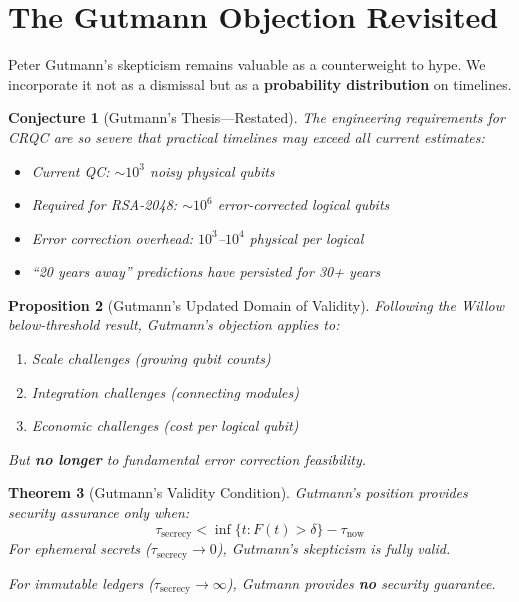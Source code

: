 \documentclass[11pt,a4paper]{article}
\newtheorem{theorem}{Theorem}[section]
\newtheorem{proposition}[theorem]{Proposition}
\newtheorem{conjecture}[theorem]{Conjecture}
\begin{document}
\section{The Gutmann Objection Revisited}

Peter Gutmann's skepticism remains valuable as a counterweight to hype. We incorporate it not as a dismissal but as a \textbf{probability distribution} on timelines.

\begin{conjecture}[Gutmann's Thesis---Restated]
The engineering requirements for CRQC are so severe that practical timelines may exceed all current estimates:
\begin{itemize}[noitemsep]
    \item Current QC: $\sim 10^3$ noisy physical qubits
    \item Required for RSA-2048: $\sim 10^6$ error-corrected logical qubits
    \item Error correction overhead: $10^3$--$10^4$ physical per logical
    \item ``20 years away'' predictions have persisted for 30+ years
\end{itemize}
\end{conjecture}

\begin{proposition}[Gutmann's Updated Domain of Validity]
Following the Willow below-threshold result, Gutmann's objection applies to:
\begin{enumerate}[noitemsep]
    \item Scale challenges (growing qubit counts)
    \item Integration challenges (connecting modules)
    \item Economic challenges (cost per logical qubit)
\end{enumerate}
But \textbf{no longer} to fundamental error correction feasibility.
\end{proposition}

\begin{theorem}[Gutmann's Validity Condition]
Gutmann's position provides security assurance only when:
\begin{equation}
\tau_{\text{secrecy}} < \inf\{t : F(t) > \delta\} - \tau_{\text{now}}
\end{equation}
For ephemeral secrets ($\tau_{\text{secrecy}} \to 0$), Gutmann's skepticism is fully valid.

For immutable ledgers ($\tau_{\text{secrecy}} \to \infty$), Gutmann provides \textbf{no} security guarantee.
\end{theorem}
\end{document}
